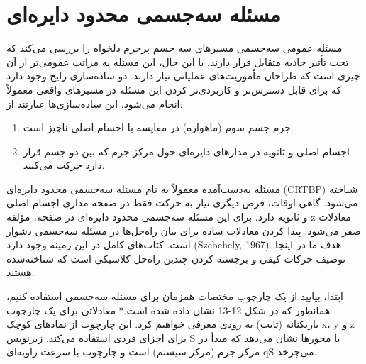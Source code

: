 \section{مسئله سه‌جسمی محدود دایره‌ای}

مسئله عمومی سه‌جسمی مسیرهای سه جسم پرجرم دلخواه را بررسی می‌کند که تحت تأثیر جاذبه متقابل قرار دارند. با این حال، این مسئله به مراتب عمومی‌تر از آن چیزی است که طراحان مأموریت‌های عملیاتی نیاز دارند. دو ساده‌سازی رایج وجود دارد که برای قابل دسترس‌تر و کاربردی‌تر کردن این مسئله در مسیرهای واقعی معمولاً انجام می‌شود. این ساده‌سازی‌ها عبارتند از:
\begin{enumerate}
	\item جرم جسم سوم (ماهواره) در مقایسه با اجسام اصلی ناچیز است.
	\item اجسام اصلی و ثانویه در مدارهای دایره‌ای حول مرکز جرم که بین دو جسم قرار دارد حرکت می‌کنند.
\end{enumerate}

مسئله به‌دست‌آمده معمولاً به نام مسئله سه‌جسمی محدود دایره‌ای (CRTBP) شناخته می‌شود. گاهی اوقات، فرض دیگری نیاز به حرکت فقط در صفحه مداری اجسام اصلی و ثانویه دارد. برای این مسئله سه‌جسمی محدود دایره‌ای در صفحه، مؤلفه z معادلات صفر می‌شود. پیدا کردن معادلات ساده برای بیان راه‌حل‌ها در مسئله سه‌جسمی دشوار است. کتاب‌های کامل در این زمینه وجود دارد (Szebehely, 1967). هدف ما در اینجا توصیف حرکات کیفی و برجسته کردن چندین راه‌حل کلاسیکی است که شناخته‌شده هستند.

ابتدا، بیایید از یک چارچوب مختصات همزمان برای مسئله سه‌جسمی استفاده کنیم، همانطور که در شکل 12-13 نشان داده شده است.* معادلاتی برای یک چارچوب باریکنانه (ثابت) به زودی معرفی خواهیم کرد. این چارچوب از نمادهای کوچک x، y و z برای اجزای فردی استفاده می‌کند. زیرنویس S با محور‌ها نشان می‌دهد که مبدأ در مرکز جرم (مرکز سیستم) است و چارچوب با سرعت زاویه‌ای qS می‌چرخد.


